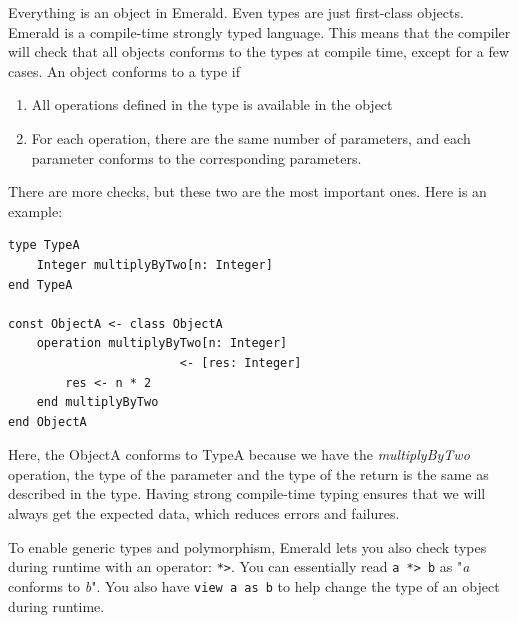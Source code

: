 Everything is an object in Emerald. Even types are just first-class objects. 
Emerald is a compile-time strongly typed language. This means that the compiler will check that all objects conforms to the types at compile time, except for a few cases. An object conforms to a type if
\begin{enumerate}
    \item All operations defined in the type is available in the object
    \item For each operation, there are the same number of parameters, and each parameter conforms to the corresponding parameters.
\end{enumerate}
There are more checks, but these two are the most important ones.
Here is an example:
\begin{lstlisting}[language=emerald]
type TypeA
    Integer multiplyByTwo[n: Integer]
end TypeA

const ObjectA <- class ObjectA
    operation multiplyByTwo[n: Integer]
                        <- [res: Integer]
        res <- n * 2
    end multiplyByTwo
end ObjectA
\end{lstlisting}
Here, the ObjectA conforms to TypeA because we have the \textit{multiplyByTwo} operation, the type of the parameter and the type of the return is the same as described in the type. Having strong compile-time typing ensures that we will always get the expected data, which reduces errors and failures.

To enable generic types and polymorphism, Emerald lets you also check types during runtime with an operator: \verb|*>|. You can essentially read \verb|a *> b| as "\textit{a} conforms to \textit{b}". You also have \verb|view a as b| to help change the type of an object during runtime.




